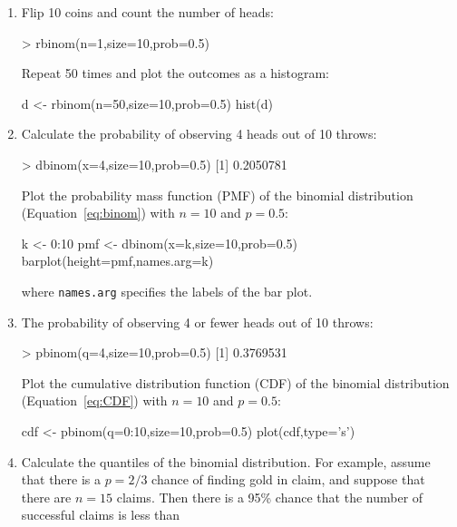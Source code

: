 \begin{enumerate}

\item Flip 10 coins and count the number of heads:

\begin{console}
> rbinom(n=1,size=10,prob=0.5)
\end{console}

Repeat 50 times and plot the outcomes as a histogram:

\begin{script}
d <- rbinom(n=50,size=10,prob=0.5)
hist(d)
\end{script}

\item Calculate the probability of observing 4 heads out of 10 throws:

\begin{console}
> dbinom(x=4,size=10,prob=0.5)
[1] 0.2050781
\end{console}

Plot the probability mass function (PMF) of the binomial distribution
(Equation~\ref{eq:binom}) with $n=10$ and $p=0.5$:

\begin{script}
k <- 0:10
pmf <- dbinom(x=k,size=10,prob=0.5)
barplot(height=pmf,names.arg=k)
\end{script}
  
\noindent where \texttt{names.arg} specifies the labels of the bar
plot.

\item The probability of observing 4 or fewer heads out of 10 throws:

\begin{console}
> pbinom(q=4,size=10,prob=0.5)
[1] 0.3769531
\end{console}

Plot the cumulative distribution function (CDF) of the binomial
distribution (Equation~\ref{eq:CDF}) with $n=10$ and $p=0.5$:

\begin{script}
cdf <- pbinom(q=0:10,size=10,prob=0.5)
plot(cdf,type='s')
\end{script}

\item\label{it:1sidedbinomR} Calculate the quantiles of the binomial
  distribution. For example, assume that there is a $p=2/3$ chance of
  finding gold in claim, and suppose that there are $n=15$
  claims. Then there is a 95\% chance that the number of successful
  claims is less than


\end{enumerate}
